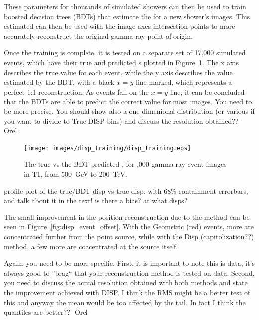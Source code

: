     These parameters for thousands of simulated showers can then be used to train boosted decision trees (BDTs) that estimate the \disp{} for a new shower's images.
    This estimated \disp{} can then be used with the image axes intersection points to more accurately reconstruct the original gamma-ray point of origin.
    
    Once the training is complete, it is tested on a separate set of 17,000 simulated events, which have their true and predicted \disp{}s plotted in Figure~\ref{fig:disptraining}.
    The x axis describes the true \disp{} value for each event, while the y axis describes the \disp{} value estimated by the BDT, with a black $x=y$ line marked, which represents a perfect 1:1 \disp{} reconstruction.
    As events fall on the $x=y$ line, it can be concluded that the BDTs are able to predict the correct \disp{} value for most images.
    {\color{red} You need to be more precise.  You should show also a one dimenional distribution (or various if you want to divide to True DISP bins) and discuss the resolution obtained?? -Orel}

    \begin{figure}[ht]
      \centering
      \texttt{[image: images/disp\_training/disp\_training.eps]}
      \caption[Disp BDT Training]{
        The true \disp{} vs the BDT-predicted \disp{}, for ,000 gamma-ray event images in T1, from \SI{500}{\GeV} to \SI{200}{\TeV}.
      }
      \label{fig:disptraining}
    \end{figure}
    
    {\color{red} profile plot of the true/BDT disp vs true disp, with 68\% containment errorbars, and talk about it in the text! is there a bias? at what disps? }

    The small improvement in the position reconstruction due to the \disp{} method can be seen in Figure~\ref{fig:disp_event_offset}.
    With the Geometric (red) events, more are concentrated further from the point source, while with the {\color{red}Disp (capitolization??)} method, a few more are concentrated at the source itself.
    
    {\color{red}Again, you need to be more specific. First, it is important to note this is data, it's always good to ''brag`` that your reconstruction method is tested on data.  Second, you need to discuss the actual resolution obtained with both methods and state the improvement achieved with DISP. I think the RMS might be a better test of this and anyway the mean would be too affected by the tail. In fact I think the quantiles are better?? -Orel}
    
